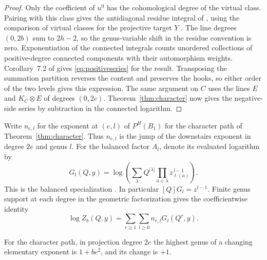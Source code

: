 \begin{proof}
Only the coefficient of $u^0$ has the cohomological degree of the
virtual class. Pairing with this class gives the antidiagonal residue
integral of \cite[\S2.2]{bp08}, using the comparison of virtual
classes for the projective target $Y$ \cite[Theorem~0.1]{siebertgw}.
The line degrees $(0,2b)$ sum to $2h-2$, so the genus-variable shift
in the residue convention is zero. Exponentiation of the connected
integrals counts unordered collections of positive-degree connected
components with their automorphism weights. Corollary~7.2 of
\cite{bp08} gives \eqref{eq:positiveseries} for the result.
Transposing the summation partition reverses the content and preserves
the hooks, so either order of the two levels gives this expression.
The same argument on $C$ uses the lines $E$ and $K_C\otimes E$ of
degrees $(0,2c)$. Theorem~\ref{thm:character} now gives the
negative-side series by subtraction in the connected logarithm.
\end{proof}

Write $n_{e,l}$ for the exponent at $(e,l)$ of $P^H(B_1)$
for the character path of Theorem~\ref{thm:character}. Thus $n_{e,l}$ is the jump
of the downstairs exponent in degree $2e$ and genus $l$. For the
balanced factor $A_l$, denote its evaluated logarithm by
\[
 G_l(Q,y)=\log\!\left(\sum_\lambda Q^{|\lambda|}
                  \prod_{a\in\lambda}z_{\ell(a)}^{\,l-1}\right).
\]
This is the balanced specialization \cite[Corollary~7.3]{bp08}.
In particular $[Q]G_l=z^{l-1}$. Finite genus support at each degree
in the geometric factorization gives the coefficientwise identity
\begin{equation}\label{eq:balancedextraction}
 \log Z_b(Q,y)=\sum_{r\ge1}\sum_{l\ge0} n_{r,l}G_l(Q^r,y).
\end{equation}

\begin{theorem}\label{thm:highest}
For the character path, in projection degree $2e$ the highest genus of a changing elementary
exponent is $1+be^2$, and its change is $+1$.
\end{theorem}

